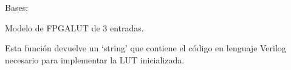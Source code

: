 \documentclass[letterpaper,10pt,english]{sphinxmanual}
\begin{document}
\begin{fulllineitems}
\label{\detokenize{myfpga:myfpga.Lut3}}
\pysigstartsignatures
{}
\pysigstopsignatures
\sphinxAtStartPar
Bases: 

\sphinxAtStartPar
Modelo de FPGA\sphinxhyphen{}LUT de 3 entradas.

\begin{fulllineitems}
\label{\detokenize{myfpga:myfpga.Lut3.impl}}
\pysigstartsignatures
{}
\pysigstopsignatures
\sphinxAtStartPar
Esta función devuelve un ‘string’ que contiene el código en lenguaje 
Verilog necesario para implementar la LUT inicializada.

\end{fulllineitems}


\end{fulllineitems}

\end{document}
